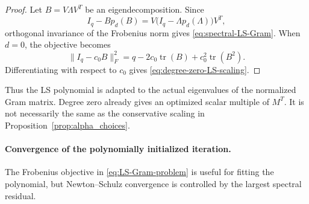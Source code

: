 \documentclass[12pt,a4paper]{article}
\theoremstyle{plain}
\theoremstyle{definition}
\theoremstyle{remark}
\begin{document}
\begin{proof}
Let $B=V\Lambda V^T$ be an eigendecomposition.  Since
\[
    I_q-Bp_d(B) = V\bigl(I_q-\Lambda p_d(\Lambda)\bigr)V^T,
\]
orthogonal invariance of the Frobenius norm gives \eqref{eq:spectral-LS-Gram}.  When $d=0$, the objective becomes
\[
    \|I_q-c_0B\|_F^2 =q-2c_0\operatorname{tr}(B)+c_0^2\operatorname{tr}(B^2).
\]
Differentiating with respect to $c_0$ gives \eqref{eq:degree-zero-LS-scaling}.
\end{proof}

Thus the LS polynomial is adapted to the actual eigenvalues of the normalized Gram matrix.  Degree zero already gives an optimized scalar multiple of $M^T$.  It is not necessarily the same as the conservative scaling in Proposition~\ref{prop:alpha_choices}.

\paragraph{Convergence of the polynomially initialized iteration.}
The Frobenius objective in \eqref{eq:LS-Gram-problem} is useful for fitting the polynomial, but Newton--Schulz convergence is controlled by the largest spectral residual.
\end{document}

